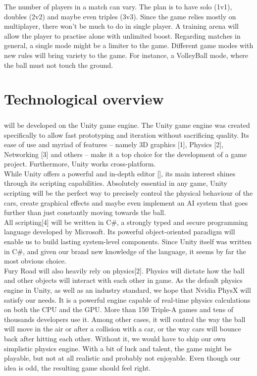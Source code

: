 The number of players in a match can vary. The plan is to have solo (1v1), doubles (2v2) and maybe even triples (3v3). Since the game relies mostly on multiplayer, there won’t be much to do in single player. A training arena will allow the player to practise alone with unlimited boost. Regarding matches in general, a single mode might be a limiter to the game. Different game modes with new rules will bring variety to the game. For instance, a VolleyBall mode, where the ball must not touch the ground.\\

\chapter{Technological overview}

\paragraph{}\FR will be developed on the Unity game engine. The Unity game engine was created specifically to allow fast prototyping and iteration without sacrificing quality. Its ease of use and myriad of features – namely 3D graphics [1], Physics [2], Networking [3] and others – make it a top choice for the development of a game project. Furthermore, Unity works cross-platform.\\

While Unity offers a powerful and in-depth editor [], its main interest shines through its scripting capabilities. Absolutely essential in any game, Unity scripting will be the perfect way to precisely control the physical behaviour of the cars, create graphical effects and maybe even implement an AI system that goes further than just constantly moving towards the ball.\\

All scripting[4] will be written in C\#, a strongly typed and secure programming language developed by Microsoft. Its powerful object-oriented paradigm will enable us to build lasting system-level components. Since Unity itself was written in C\#, and given our brand new knowledge of the language, it seems by far the most obvious choice.\\

Fury Road will also heavily rely on physics[2]. Physics will dictate how the ball and other objects will interact with each other in game. As the default physics engine in Unity, as well as an industry standard, we hope that Nvidia PhysX will satisfy our needs. It is a powerful engine capable of real-time physics calculations on both the CPU and the GPU. More than 150 Triple-A games and tens of thousands developers use it. Among other cases, it will control the way the ball will move in the air or after a collision with a car, or the way cars will bounce back after hitting each other. Without it, we would have to ship our own simplistic physics engine. With a bit of luck and talent, the game might be playable, but not at all realistic and probably not enjoyable. Even though our idea is odd, the resulting game should feel right.\\


